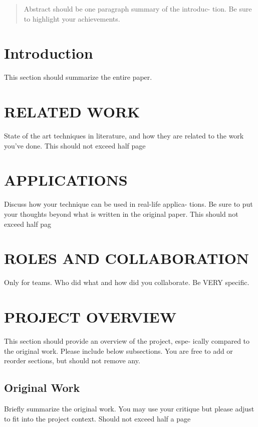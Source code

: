 \documentclass{acm_proc_article-sp}
\begin{document}

\maketitle
\begin{abstract}
Abstract should be one paragraph summary of the introduc-
tion.  Be sure to highlight your achievements.
\end{abstract}




\section{Introduction}
This section should summarize the entire paper.

\section{RELATED WORK}
State of the art techniques in literature, and how they are
related to the work you’ve done.  This should not exceed half
page

\section{APPLICATIONS}
Discuss how your technique can be used in real-life applica-
tions.  Be sure to put your thoughts beyond what is written
in the original paper.  This should not exceed half pag

\section{ROLES AND COLLABORATION}
Only for teams.  Who did what and how did you collaborate.
Be VERY specific.

\section{PROJECT OVERVIEW}
This section should provide an overview of the project, espe-
ically compared to the original work.  Please include below
subsections.   You  are  free  to  add  or  reorder  sections,  but
should not remove any.

\subsection{Original Work}
Briefly  summarize  the  original  work.   You  may  use  your
critique  but  please  adjust  to  fit  into  the  project  context.
Should not exceed half a page
\end{document}
